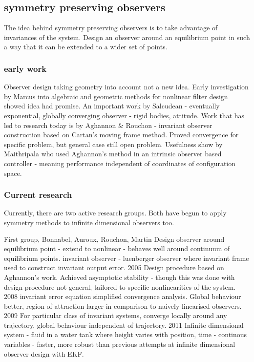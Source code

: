 \subsection{symmetry preserving observers}
The idea behind symmetry preserving observers is to take advantage of invariances of the system. Design an observer around an equilibrium point in such a way that it can be extended to a wider set of points.

\subsubsection{early work}
Observer design taking geometry into account not a new idea. Early investigation by Marcus \cite{marcus1984algebraic} into algebraic and geometric methods for nonlinear filter design showed idea had promise.
An important work by Salcudean - eventually exponential, globally converging observer - rigid bodies, attitude.
Work that has led to research today is by Aghannon \& Rouchon \cite{aghannan2002invariant} - invariant observer construction based on Cartan's moving frame method. Proved convergence for specific problem, but general case still open problem.
Usefulness show by Maithripala \cite{maithripala2005intrinsic} who used Aghannon's method in an intrinsic observer based controller - meaning performance independent of coordinates of configuration space.


\subsubsection{Current research}
Currently, there are two active research groups. Both have begun to apply symmetry methods to infinite dimensional observers too.

First group, Bonnabel, Auroux, Rouchon, Martin
Design observer around equilibrium point - extend to nonlinear - behaves well around continuum of equilibrium points. 
invariant observer - luenberger observer where invariant frame used to construct invariant output error.
2005 \cite{bonnabel2005invariant} Design procedure based on Aghannon's work. Achieved asymptotic stability - though this was done with design procedure not general, tailored to specific nonlinearities of the system.
2008 \cite{bonnabel2008symmetry} invariant error equation simplified convergence analysis. Global behaviour better, region of attraction larger in comparison to naively linearised observers.
2009 \cite{bonnabel2009non} For particular class of invariant systems, converge locally around any trajectory, global behaviour independent of trajectory.
2011 \cite{auroux2011symmetry} Infinite dimensional system - fluid in a water tank where height varies with position, time - continous variables - faster, more robust than previous attempts at infinite dimensional observer design with EKF.


